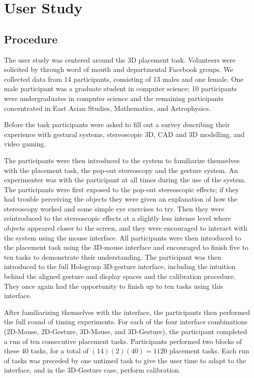 \documentclass[pageno]{jpaper}
\begin{document}
\section{User Study}
\subsection{Procedure}
The user study was centered around the 3D placement task. Volunteers were solicited by 
through word of mouth and departmental Facebook groups. We collected data from 14 participants,
consisting of 13 males and one female. One male participant was a graduate student in computer
science; 10 participants were undergraduates in computer science and the remaining participants
concentrated in East Asian Studies, Mathematics, and Astrophysics.

Before the task participants were asked to fill out a survey describing their experience with
gestural systems, stereoscopic 3D, CAD and 3D modelling, and video gaming. 

The participants were then introduced to the system to familiarize themselves with the placement task, the pop-out
stereoscopy and the gesture system. An experimenter was with the participant at all times during
the use of the system. The participants were first exposed to the pop-out stereoscopic effects;
if they had trouble perceiving the objects they were given an explanation of how the stereoscopy
worked and some simple eye exercises to try. Then they were reintroduced to the stereoscopic effects
at a slightly less intense level where objects appeared closer to the screen, and they were encouraged
to interact with the system using the mouse interface. All participants were then introduced to the placement
task using the 3D-mouse interface and encouraged to finish five to ten tasks to demonstrate their understanding.
The participant was then introduced to the full Holograsp 3D-gesture interface, including the intuition behind the aligned gesture and display
spaces and the calibration procedure. They once again had the opportunity to finish up to ten tasks using this interface.

After familiarizing themselves with the interface, the participants then performed the full round of timing experiments.
For each of the four interface combinations (2D-Mouse, 2D-Gesture, 3D-Mouse, and 3D-Gesture), the participant completed a 
run of ten consecutive placement tasks. Participants performed two blocks of these 40 tasks, for a total of $(14)(2)(40) = 1120$
placement tasks. Each run of tasks was preceded by one untimed task to give the user time to adapt to the interface, and 
in the 3D-Gesture case, perform calibration.
\end{document}
